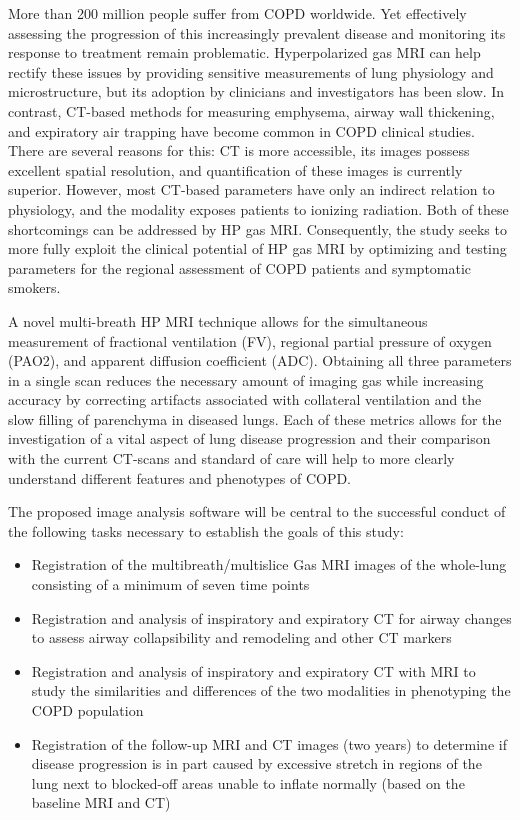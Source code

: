 \documentclass[11pt,]{article}
\begin{document}
More than 200 million people suffer from COPD worldwide. Yet effectively
assessing the progression of this increasingly prevalent disease and
monitoring its response to treatment remain problematic. Hyperpolarized
gas MRI can help rectify these issues by providing sensitive
measurements of lung physiology and microstructure, but its adoption by
clinicians and investigators has been slow. In contrast, CT-based
methods for measuring emphysema, airway wall thickening, and expiratory
air trapping have become common in COPD clinical studies. There are
several reasons for this: CT is more accessible, its images possess
excellent spatial resolution, and quantification of these images is
currently superior. However, most CT-based parameters have only an
indirect relation to physiology, and the modality exposes patients to
ionizing radiation. Both of these shortcomings can be addressed by HP
gas MRI. Consequently, the study seeks to more fully exploit the
clinical potential of HP gas MRI by optimizing and testing parameters
for the regional assessment of COPD patients and symptomatic smokers.

A novel multi-breath HP MRI technique allows for the simultaneous
measurement of fractional ventilation (FV), regional partial pressure of
oxygen (PAO2), and apparent diffusion coefficient (ADC). Obtaining all
three parameters in a single scan reduces the necessary amount of
imaging gas while increasing accuracy by correcting artifacts associated
with collateral ventilation and the slow filling of parenchyma in
diseased lungs. Each of these metrics allows for the investigation of a
vital aspect of lung disease progression and their comparison with the
current CT-scans and standard of care will help to more clearly
understand different features and phenotypes of COPD.

The proposed image analysis software will be central to the successful
conduct of the following tasks necessary to establish the goals of this
study:

\begin{itemize}
\itemsep1pt\parskip0pt
\item
  Registration of the multibreath/multislice Gas MRI images of the
  whole-lung consisting of a minimum of seven time points
\item
  Registration and analysis of inspiratory and expiratory CT for airway
  changes to assess airway collapsibility and remodeling and other CT
  markers
\item
  Registration and analysis of inspiratory and expiratory CT with MRI to
  study the similarities and differences of the two modalities in
  phenotyping the COPD population
\item
  Registration of the follow-up MRI and CT images (two years) to
  determine if disease progression is in part caused by excessive
  stretch in regions of the lung next to blocked-off areas unable to
  inflate normally (based on the baseline MRI and CT)
\end{itemize}
\end{document}

